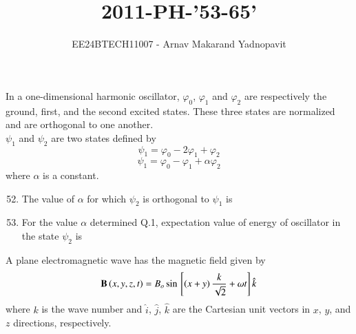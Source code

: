 \documentclass[journal,12pt,onecolumn]{IEEEtran}
\theoremstyle{remark}
\begin{document}
\title{2011-PH-'53-65'}
\author{EE24BTECH11007 - Arnav Makarand Yadnopavit}
\maketitle
\renewcommand{\thefigure}{\theenumi}
\renewcommand{\thetable}{\theenumi}
In a one-dimensional harmonic oscillator, $\varphi_0$, $\varphi_1$ and $\varphi_2$ are respectively the ground, first, and the second excited states. These three states are normalized and are orthogonal to one another.\\
$\psi_1$ and $\psi_2$ are two states defined by
$$\psi_1=\varphi_0-2\varphi_1+\varphi_2$$
$$\psi_1=\varphi_0-\varphi_1+\alpha\varphi_2$$
where $\alpha$ is a constant.
\begin{enumerate}
\setcounter{enumi}{51}
\item The value of $\alpha$ for which $\psi_2$ is orthogonal to $\psi_1$ is
\begin{enumerate}
\end{enumerate}
\item For the value $\alpha$ determined Q.1, expectation value of energy of oscillator in the state $\psi_2$ is
\begin{enumerate}
\end{enumerate}
\end{enumerate}
A plane electromagnetic wave has the magnetic field given by
$$\mathbf{B}\left(x,y,z,t\right)=B_o\sin{}\left[\left(x+y\right)\frac{k}{\sqrt{2}}+\omega t\right]\hat{k}$$
where $k$ is the wave number and $\hat{i}$, $\hat{j}$, $\hat{k}$ are the Cartesian unit vectors in $x$, $y$, and $z$ directions, respectively.
\end{document}
